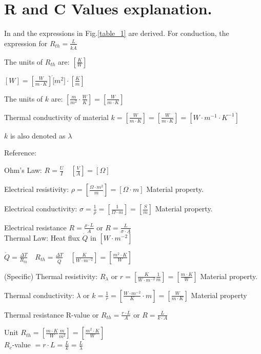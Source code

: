 \section{R and C Values explanation.}

In \cite{HTTHERMO} and \cite{FUND} the expressions in Fig.\ref{table_1} are derived.
For conduction, the expression for $R_{th} = \frac{L}{k\dot A}$


The units of $R_{th}$ are: $ [\frac{K}{W}] $

$ [W] = [\frac{W}{m \cdot K}] \dot [m^2] \cdot [\frac{K}{m}] $

The units of $k$ are: $ [\frac{m}{m^2} \cdot \frac{W}{K}] = [\frac{W}{m \cdot K}]$

Thermal conductivity of material $k = [\frac{W}{m \cdot K }] = [\frac{W}{m \cdot K }]  = [W \cdot m^{-1} \cdot K^{-1}]$

$k$ is also denoted as $\lambda$

Reference: \cite{ELECRESCOND}

Ohm's Law: $ R = \frac{U}{I} \quad [\frac{V}{A}] = [\Omega] $

Electrical resistivity: $ \rho = [\frac{\Omega \cdot m^2}{m} ] = [\Omega \cdot m] $ Material property.

Electrical conductivity: $ \sigma = \frac{1}{\rho} =[\frac{1}{\Omega \cdot m}] = [\frac{S}{m}] $ Material property.

Electrical resistance $ R = \frac{\rho \cdot L}{A} $ or $ R = \frac{L}{\sigma \cdot A} $
\\

Thermal Law: 
Heat flux $ \dot Q $ in $ [W \cdot m^{-2}] $

$ \dot Q = \frac{\Delta T}{R_{th}} \quad R_{th} = \frac{\Delta T}{\dot  Q} 
\quad [\frac{K}{W \cdot m^{-2}}] = [\frac{m^2 \cdot K}{W}]$

(Specific) Thermal resistivity: $ R_\lambda $ or $ r = [\frac{K}{W \cdot m^{-2}} \frac{1}{m} ] = [\frac{m \cdot K}{W}] $ Material property.

Thermal conductivity: $ \lambda $ or $ k  = \frac{1}{r} = [\frac{ W \cdot m^{-2} }{K} \cdot m] 
= [\frac{W}{m \cdot K}] $ Material property

Thermal resistance R-value or $ R_{th} = \frac{r \cdot L}{A} $ or $ R = \frac{L}{k \cdot A} $

Unit $ R_{th} = [\frac{m \cdot K}{W} \frac{m}{m^2}] = [\frac{m^2 \cdot K}{W}] $
\\

$R_c$-value $ = r \cdot L = \frac{L}{k} = \frac{L}{\lambda} $

\newpage
